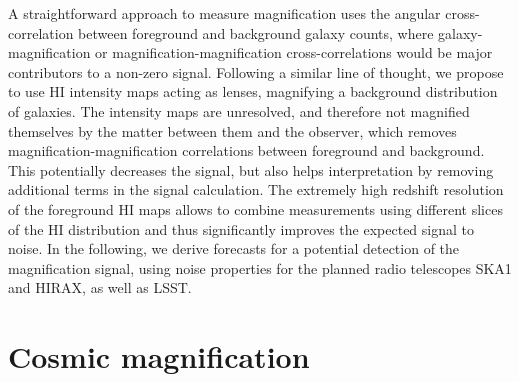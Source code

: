\documentclass[useAMS,usenatbib]{mnras}
\begin{document}
A straightforward approach to measure magnification uses the angular cross-correlation between foreground and background galaxy counts, where galaxy-magnification or magnification-magnification cross-correlations would be major contributors to a non-zero signal. Following a similar line of thought, we propose to use HI intensity maps acting as lenses, magnifying a background distribution of galaxies. The intensity maps are unresolved, and therefore not magnified themselves by the matter between them and the observer, which removes magnification-magnification correlations between foreground and background. This potentially decreases the signal, but also helps interpretation by removing additional terms in the signal calculation. The extremely high redshift resolution of the foreground HI maps allows to combine measurements using different slices of the HI distribution and thus significantly improves the expected signal to noise. In the following, we derive forecasts for a potential detection of the magnification signal, using noise properties for the planned radio telescopes SKA1 and HIRAX, as well as LSST.


\section{Cosmic magnification}
\end{document}
